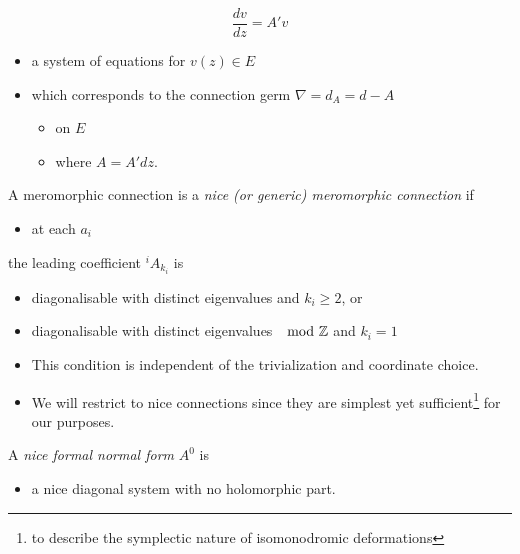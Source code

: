 \begin{paracol}{2}
\begin{rem}
\begin{itemize}
        \[
          \frac{dv}{dz}=A'v
        \]
        \begin{itemize}
          \item a system of equations for $v(z)\in E$
          \item which corresponds to the connection germ $\nabla=d_A=d-A$
            \begin{itemize}
              \item on $E$
              \item where $A=A'dz$.
            \end{itemize}
        \end{itemize}
    \end{itemize}
  \end{rem}
\end{paracol}
\begin{paracol}{2}\sloppy
\switchcolumn[0]\noindent
\begin{defn}
  A meromorphic connection is a \emph{nice (or generic) meromorphic connection}
  if
  \begin{itemize}
    \item at each $a_i$
  \end{itemize}
  the leading coefficient ${}^iA_{k_i}$ is
  \begin{itemize}
    \item diagonalisable with distinct eigenvalues and $k_i\geq2$, or
    \item diagonalisable with distinct eigenvalues $\mod{\mathbb{Z}}$ and $k_i=1$
  \end{itemize}
  \begin{rem}
    \begin{itemize}
      \item This condition is independent of the trivialization and coordinate
        choice.
      \item We will restrict to nice connections since they are simplest yet
        sufficient\footnote{to describe the symplectic nature of isomonodromic
        deformations} for our purposes.
    \end{itemize}
  \end{rem}
\end{defn}
\switchcolumn[1]\noindent
  \begin{defn}
    A \emph{nice formal normal form} $A^0$ is
    \begin{itemize}
      \item a nice diagonal system with no holomorphic part.
    \end{itemize}

\end{defn}
\end{paracol}
